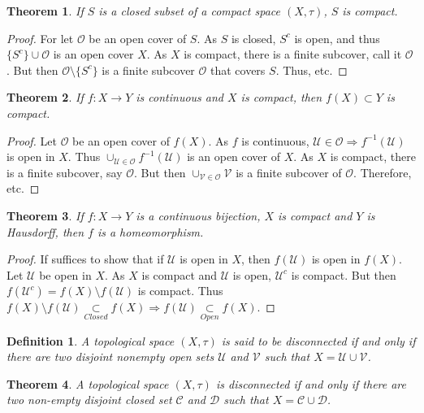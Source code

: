 \documentclass[crop=false,class=book]{standalone}
\theoremstyle{mystyle}
\newtheorem{theorem}{Theorem}[section]
\newtheorem{definition}{Definition}[section]
\begin{document}
\begin{theorem}
If $S$ is a closed subset of a compact space $(X,\tau)$, $S$ is compact.
\end{theorem}
\begin{proof}
For let $\mathcal{O}$ be an open cover of $S$. As $S$ is closed, $S^c$ is open, and thus $\{S^c\} \cup \mathcal{O}$ is an open cover $X$. As $X$ is compact, there is a finite subcover, call it $\mathscr{O}$. But then $\mathscr{O}\setminus \{S^c\}$ is a finite subcover $\mathcal{O}$ that covers $S$. Thus, etc.
\end{proof}
\begin{theorem}
If $f:X\rightarrow Y$ is continuous and $X$ is compact, then $f(X)\subset Y$ is compact.
\end{theorem}
\begin{proof}
Let $\mathcal{O}$ be an open cover of $f(X)$. As $f$ is continuous, $\mathcal{U}\in\mathcal{O}\Rightarrow f^{-1}(\mathcal{U})$ is open in $X$. Thus $\cup_{\mathcal{U}\in \mathcal{O}} f^{-1}(\mathcal{U})$ is an open cover of $X$. As $X$ is compact, there is a finite subcover, say $\mathscr{O}$. But then $\cup_{\mathcal{V}\in \mathscr{O}} \mathcal{V}$ is a finite subcover of $\mathcal{O}$. Therefore, etc.
\end{proof}
\begin{theorem}
If $f:X\rightarrow Y$ is a continuous bijection, $X$ is compact and $Y$ is Hausdorff, then $f$ is a homeomorphism.
\end{theorem}
\begin{proof}
If suffices to show that if $\mathcal{U}$ is open in $X$, then $f(\mathcal{U})$ is open in $f(X)$. Let $\mathcal{U}$ be open in $X$. As $X$ is compact and $\mathcal{U}$ is open, $\mathcal{U}^c$ is compact. But then $f(\mathcal{U}^c) = f(X)\setminus f(\mathcal{U})$ is compact. Thus $f(X)\setminus f(\mathcal{U})\underset{Closed}\subset f(X)\Rightarrow f(\mathcal{U})\underset{Open}\subset f(X)$.
\end{proof}
\begin{definition}
A topological space $(X,\tau)$ is said to be disconnected if and only if there are two disjoint nonempty open sets $\mathcal{U}$ and $\mathcal{V}$ such that $X = \mathcal{U}\cup \mathcal{V}$.
\end{definition}
\begin{theorem}
A topological space $(X,\tau)$ is disconnected if and only if there are two non-empty disjoint closed set $\mathcal{C}$ and $\mathcal{D}$ such that $X=\mathcal{C}\cup\mathcal{D}$.
\end{theorem}
\end{document}
